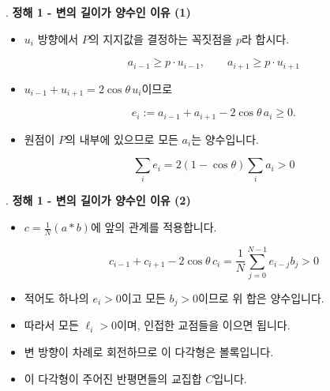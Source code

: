 \begin{frame}{\textbf{\pletter}. \ptitle}
    \textbf{정해 1 - 변의 길이가 양수인 이유 (1)}
    \begin{itemize}
        \setlength{\abovedisplayskip}{5pt}
        \setlength{\belowdisplayskip}{5pt}
        \item $u_i$ 방향에서 $P$의 지지값을 결정하는 꼭짓점을 $p$라 합시다.
    
    \[
        a_{i-1}\ge p\cdot u_{i-1},\qquad
        a_{i+1}\ge p\cdot u_{i+1}
    \]
    
        \item $u_{i-1}+u_{i+1}=2\cos\theta\,u_i$이므로
    
    \[
        e_i:=a_{i-1}+a_{i+1}-2\cos\theta\,a_i\ge0.
    \]
    
        \item 원점이 $P$의 내부에 있으므로 모든 $a_i$는 양수입니다.
    
    \[
        \sum_i e_i=2(1-\cos\theta)\sum_i a_i>0
    \]
    
    \end{itemize}
\end{frame}

\begin{frame}{\textbf{\pletter}. \ptitle}
    \textbf{정해 1 - 변의 길이가 양수인 이유 (2)}
    \begin{itemize}
        \item $c=\frac1N(a*b)$에 앞의 관계를 적용합니다.
    
    \[
        c_{i-1}+c_{i+1}-2\cos\theta\,c_i
        =\frac1N\sum_{j=0}^{N-1}e_{i-j}b_j>0
    \]
    
        \item 적어도 하나의 $e_i>0$이고 모든 $b_j>0$이므로 위 합은 양수입니다.
        \item 따라서 모든 $\ell_i>0$이며, 인접한 교점들을 이으면 됩니다.
        \item 변 방향이 차례로 회전하므로 이 다각형은 볼록입니다.
        \item 이 다각형이 주어진 반평면들의 교집합 $C$입니다.
    \end{itemize}
\end{frame}

